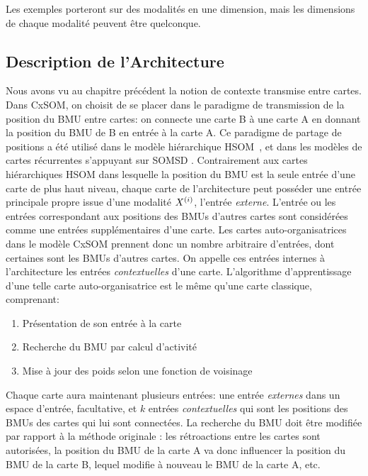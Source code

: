 Les exemples porteront sur des modalités en une dimension, mais les dimensions de chaque modalité peuvent être quelconque.

\subsection{Description de l'Architecture}

Nous avons vu au chapitre précédent la notion de contexte transmise entre cartes. Dans CxSOM, on choisit de se placer dans le paradigme de transmission de la position du BMU entre cartes: on connecte une carte B à une carte A en donnant la position du BMU de B en entrée à la carte A. 
Ce paradigme de partage de positions a été utilisé dans le modèle hiérarchique HSOM~\cite{lampinen_clustering_1992}, et dans les modèles de cartes récurrentes s'appuyant sur SOMSD \cite{hammer_recursive_2004,hagenbuchner_self-organizing_2003,fix20}. 
 Contrairement aux cartes hiérarchiques HSOM dans lesquelle la position du BMU est la seule entrée d'une carte de plus haut niveau, chaque carte de l'architecture peut posséder une entrée principale propre issue d'une modalité $X^{({i})}$, l'entrée \emph{externe}. L'entrée ou les entrées correspondant aux positions des BMUs d'autres cartes sont considérées comme une entrées supplémentaires d'une carte. Les cartes auto-organisatrices dans le modèle CxSOM prennent donc un nombre arbitraire d'entrées, dont certaines sont les BMUs d'autres cartes. On appelle ces entrées internes à l'architecture les entrées \emph{contextuelles} d'une carte.
L'algorithme d'apprentissage d'une telle carte auto-organisatrice est le même qu'une carte classique, comprenant:
\begin{enumerate}
\item\label{etape:entree} Présentation de son entrée à la carte 
\item\label{etape:bmu} Recherche du BMU par calcul d'activité
\item\label{etape:maj} Mise à jour des poids selon une fonction de voisinage
\end{enumerate}

Chaque carte aura maintenant plusieurs entrées: une entrée \emph{externes} dans un espace d'entrée, facultative, et $k$ entrées \emph{contextuelles} qui sont les positions des BMUs des cartes qui lui sont connectées. 
La recherche du BMU doit être modifiée par rapport à la méthode originale : les rétroactions entre les cartes sont autorisées, la position du BMU de la carte A va donc influencer la position du BMU de la carte B, lequel modifie à nouveau le BMU de la carte A, etc. 


